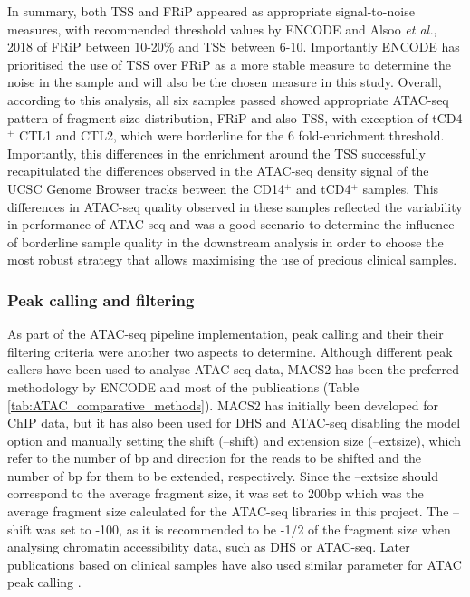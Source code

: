 In summary, both TSS and FRiP appeared as appropriate signal-to-noise measures, with recommended threshold values by ENCODE and Alsoo \textit{et al.}, 2018 of FRiP between 10-20\% and TSS between 6-10. Importantly ENCODE has prioritised the use of TSS over FRiP as a more stable measure to determine the noise in the sample and will also be the chosen measure in this study. Overall, according to this analysis, all six samples passed showed appropriate ATAC-seq pattern of fragment size distribution, FRiP and also TSS, with exception of tCD4$^+$ CTL1 and CTL2, which were borderline for the 6 fold-enrichment threshold. Importantly, this differences in the enrichment around the TSS successfully recapitulated the differences observed in the ATAC-seq density signal of the UCSC Genome Browser tracks between the CD14$^+$ and tCD4$^+$ samples. This differences in ATAC-seq quality observed in these samples reflected the variability in performance of ATAC-seq and was a good scenario to determine the influence of borderline sample quality in the downstream analysis in order to choose the most robust strategy that allows maximising the use of precious clinical samples. 
	

\subsubsection{Peak calling and filtering}
\label{peak_filtering}
As part of the ATAC-seq pipeline implementation, peak calling and their their filtering criteria were another two aspects to determine.
Although different peak callers have been used to analyse ATAC-seq data, MACS2 has been the preferred methodology by ENCODE and most of the publications (Table \ref{tab:ATAC_comparative_methods}). MACS2 has initially been developed for ChIP data, but it has also been used for DHS and ATAC-seq disabling the model option and manually setting the shift (--shift) and extension size (--extsize), which refer to the number of bp and direction for the reads to be shifted and the number of bp for them to be extended, respectively. Since the --extsize should correspond to the average fragment size, it was set to 200bp which was the average fragment size calculated for the ATAC-seq libraries in this project. The --shift was set to -100, as it is recommended to be -1/2 of the fragment size when analysing chromatin accessibility data, such as DHS or ATAC-seq. Later publications based on clinical samples have also used similar parameter for ATAC peak calling \parencite{Wang2018}. 

